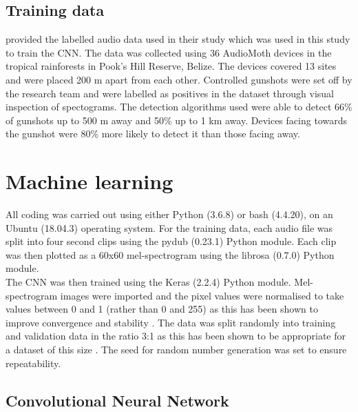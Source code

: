 \subsection{Training data}

\cite{Hill2018} provided the labelled audio data used in their study which was used in this study to train the CNN. The data was collected using 36 AudioMoth devices in the tropical rainforests in Pook's Hill Reserve, Belize. The devices covered 13 sites and were placed 200 m apart from each other. Controlled gunshots were set off by the research team and were labelled as positives in the dataset through visual inspection of spectograms. The detection algorithms used were able to detect 66\% of gunshots up to 500 m away and 50\% up to 1 km away. Devices facing towards the gunshot were 80\% more likely to detect it than those facing away.



\section{Machine learning}

All coding was carried out using either Python (3.6.8) or bash (4.4.20), on an Ubuntu (18.04.3) operating system. For the training data, each audio file was split into four second clips using the pydub (0.23.1) Python module. Each clip was then plotted as a 60x60 mel-spectrogram using the librosa (0.7.0) Python module.\\

\noindent The CNN was then trained using the Keras (2.2.4) Python module. Mel-spectrogram images were imported and the pixel values were normalised to take values between 0 and 1 (rather than 0 and 255) as this has been shown to improve convergence and stability \citep{Liao2016}. The data was split randomly into training and validation data in the ratio 3:1 as this has been shown to be appropriate for a dataset of this size \citep{Guyon1997}. The seed for random number generation was set to ensure repeatability.

\subsection{Convolutional Neural Network}


